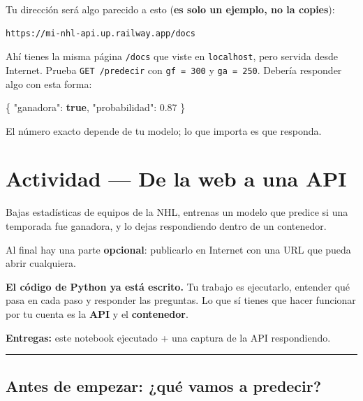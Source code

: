 \documentclass[
]{article}
\newenvironment{Shaded}{}{}
\newcommand{\DataTypeTok}[1]{\textcolor[rgb]{0.56,0.13,0.00}{#1}}
\newcommand{\FloatTok}[1]{\textcolor[rgb]{0.25,0.63,0.44}{#1}}
\newcommand{\FunctionTok}[1]{\textcolor[rgb]{0.02,0.16,0.49}{#1}}
\newcommand{\KeywordTok}[1]{\textcolor[rgb]{0.00,0.44,0.13}{\textbf{#1}}}
\begin{document}
Tu dirección será algo parecido a esto (\textbf{es solo un ejemplo, no
la copies}):

\begin{verbatim}
https://mi-nhl-api.up.railway.app/docs
\end{verbatim}

Ahí tienes la misma página \texttt{/docs} que viste en
\texttt{localhost}, pero servida desde Internet. Prueba
\texttt{GET\ /predecir} con \texttt{gf\ =\ 300} y \texttt{ga\ =\ 250}.
Debería responder algo con esta forma:

\begin{Shaded}
\begin{Highlighting}[]
\FunctionTok{\{}
  \DataTypeTok{"ganadora"}\FunctionTok{:} \KeywordTok{true}\FunctionTok{,}
  \DataTypeTok{"probabilidad"}\FunctionTok{:} \FloatTok{0.87}
\FunctionTok{\}}
\end{Highlighting}
\end{Shaded}

El número exacto depende de tu modelo; lo que importa es que responda.

\protect{}\label{3614f0f4}
\section{Actividad --- De la web a una
API}\label{actividad--de-la-web-a-una-api}

Bajas estadísticas de equipos de la NHL, entrenas un modelo que predice
si una temporada fue ganadora, y lo dejas respondiendo dentro de un
contenedor.

Al final hay una parte \textbf{opcional}: publicarlo en Internet con una
URL que pueda abrir cualquiera.

\textbf{El código de Python ya está escrito.} Tu trabajo es ejecutarlo,
entender qué pasa en cada paso y responder las preguntas. Lo que sí
tienes que hacer funcionar por tu cuenta es la \textbf{API} y el
\textbf{contenedor}.

\textbf{Entregas:} este notebook ejecutado + una captura de la API
respondiendo.

\protect{}\label{685c3e12}
\begin{center}\rule{0.5\linewidth}{0.5pt}\end{center}

\subsection{Antes de empezar: ¿qué vamos a
predecir?}\label{antes-de-empezar-quuxe9-vamos-a-predecir}
\end{document}
